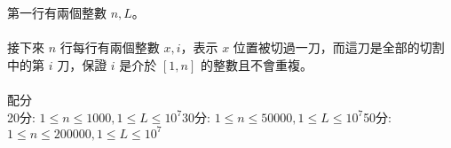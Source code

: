第一行有兩個整數 $n, L$。\\
\\
接下來 $n$ 行每行有兩個整數 $x, i$，表示 $x$ 位置被切過一刀，而這刀是全部的切割中的第 $i$ 刀，保證 $i$ 是介於 $[1,n]$ 的整數且不會重複。\\
\\
配分\\
20分: $1\leq n \leq 1000, 1\leq L \leq 10^7$30分: $1\leq n \leq 50000, 1\leq L \leq 10^7$50分: $1\leq n \leq 200000, 1\leq L \leq 10^7$